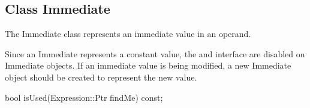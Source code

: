 \subsection{Class Immediate}
\label{sec:immediate}


The Immediate class represents an immediate value in an operand.

Since an Immediate represents a constant value, the  and
 interface are disabled on Immediate objects. If an immediate
value is being modified, a new Immediate object should be created to represent
the new value.

\begin{apient}
bool isUsed(Expression::Ptr findMe) const;
\end{apient}

